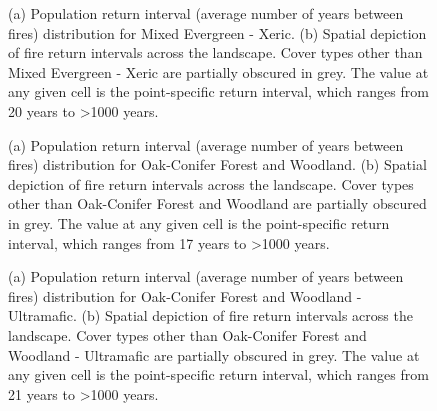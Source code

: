 \begin{figure}[!htbp]
  \centering
  \caption{(a) Population return interval (average number of years between fires) distribution for Mixed Evergreen - Xeric.  (b) Spatial depiction of fire return intervals across the landscape. Cover types other than Mixed Evergreen - Xeric are partially obscured in grey. The value at any given cell is the point-specific return interval, which ranges from 20 years to \textgreater 1000 years.}
\label{fig:preturn_megx}
\end{figure}

\begin{figure}[!htbp]
  \centering
  \caption{(a) Population return interval (average number of years between fires) distribution for Oak-Conifer Forest and Woodland.  (b) Spatial depiction of fire return intervals across the landscape. Cover types other than Oak-Conifer Forest and Woodland are partially obscured in grey. The value at any given cell is the point-specific return interval, which ranges from 17 years to \textgreater 1000 years.}
\label{fig:preturn_ocfw}
\end{figure}

\begin{figure}[!htbp]
  \centering
  \caption{(a) Population return interval (average number of years between fires) distribution for Oak-Conifer Forest and Woodland - Ultramafic.  (b) Spatial depiction of fire return intervals across the landscape. Cover types other than Oak-Conifer Forest and Woodland - Ultramafic are partially obscured in grey. The value at any given cell is the point-specific return interval, which ranges from 21 years to \textgreater 1000 years.}
\label{fig:preturn_ocfwu}
\end{figure}

